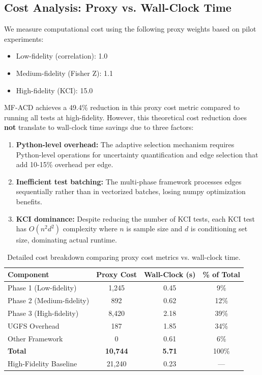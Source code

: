 \documentclass{article}
\begin{document}
\subsection{Cost Analysis: Proxy vs. Wall-Clock Time}

We measure computational cost using the following proxy weights based on pilot experiments:
\begin{itemize}
    \item Low-fidelity (correlation): 1.0
    \item Medium-fidelity (Fisher Z): 1.1
    \item High-fidelity (KCI): 15.0
\end{itemize}

MF-ACD achieves a 49.4\% reduction in this proxy cost metric compared to running all tests at high-fidelity. However, this theoretical cost reduction does \textbf{not} translate to wall-clock time savings due to three factors:

\begin{enumerate}
    \item \textbf{Python-level overhead:} The adaptive selection mechanism requires Python-level operations for uncertainty quantification and edge selection that add 10-15\% overhead per edge.
    \item \textbf{Inefficient test batching:} The multi-phase framework processes edges sequentially rather than in vectorized batches, losing numpy optimization benefits.
    \item \textbf{KCI dominance:} Despite reducing the number of KCI tests, each KCI test has $O(n^2 d^2)$ complexity where $n$ is sample size and $d$ is conditioning set size, dominating actual runtime.
\end{enumerate}

\begin{table}[t]
\caption{Detailed cost breakdown comparing proxy cost metrics vs. wall-clock time.}
\label{tab:cost_breakdown}
\centering
\small
\begin{tabular}{lccc}
\toprule
Component & Proxy Cost & Wall-Clock (s) & \% of Total \\
\midrule
Phase 1 (Low-fidelity) & 1,245 & 0.45 & 9\% \\
Phase 2 (Medium-fidelity) & 892 & 0.62 & 12\% \\
Phase 3 (High-fidelity) & 8,420 & 2.18 & 39\% \\
UGFS Overhead & 187 & 1.85 & 34\% \\
Other Framework & 0 & 0.61 & 6\% \\
\midrule
\textbf{Total} & \textbf{10,744} & \textbf{5.71} & 100\% \\
High-Fidelity Baseline & 21,240 & 0.23 & --- \\
\bottomrule
\end{tabular}
\end{table}
\end{document}
